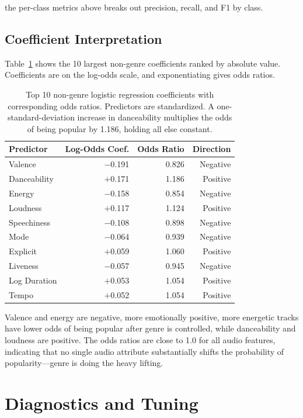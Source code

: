 \documentclass[12pt, oneside]{book}
\begin{document}
the per-class metrics above breaks out precision, recall, and F1 by class.
 
 
\subsection*{Coefficient Interpretation}
 
Table~\ref{tab:ch5_coefs} shows the 10 largest non-genre coefficients ranked by absolute value. Coefficients are on the log-odds scale, and exponentiating gives odds ratios.
 
\begin{table}[H]
\centering
\caption{Top 10 non-genre logistic regression coefficients with corresponding odds ratios. Predictors are standardized. A one-standard-deviation increase in danceability multiplies the odds of being popular by 1.186, holding all else constant.}
\label{tab:ch5_coefs}
\begin{tabular}{lrrr}
\toprule
\textbf{Predictor} & \textbf{Log-Odds Coef.} & \textbf{Odds Ratio} & \textbf{Direction} \\
\midrule
Valence          & $-$0.191 & 0.826 & Negative \\
Danceability     & $+$0.171 & 1.186 & Positive \\
Energy           & $-$0.158 & 0.854 & Negative \\
Loudness         & $+$0.117 & 1.124 & Positive \\
Speechiness      & $-$0.108 & 0.898 & Negative \\
Mode             & $-$0.064 & 0.939 & Negative \\
Explicit         & $+$0.059 & 1.060 & Positive \\
Liveness         & $-$0.057 & 0.945 & Negative \\
Log Duration     & $+$0.053 & 1.054 & Positive \\
Tempo            & $+$0.052 & 1.054 & Positive \\
\bottomrule
\end{tabular}
\end{table}
 
Valence and energy are negative, more emotionally positive, more energetic tracks have lower odds of being popular after genre is controlled, while danceability and loudness are positive. The odds ratios are close to 1.0 for all audio features, indicating that no single audio attribute substantially shifts the probability of popularity—genre is doing the heavy lifting.
 
\section{Diagnostics and Tuning}
 
\end{document}
